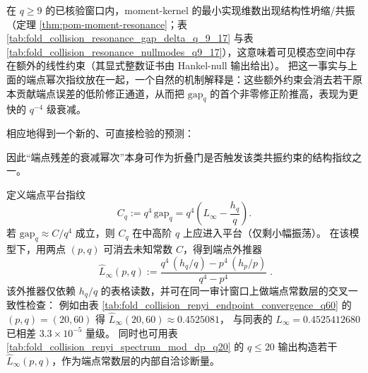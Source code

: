 \begin{remark}\label{rem:pom-endpoint-gap-resonance-link}
在 \(q\ge 9\) 的已核验窗口内，moment-kernel 的最小实现维数出现结构性坍缩/共振（定理 \ref{thm:pom-moment-resonance}；表 \ref{tab:fold_collision_resonance_gap_delta_q_9_17} 与表 \ref{tab:fold_collision_resonance_nullmodes_q9_17}），这意味着可见模态空间中存在额外的线性约束（其显式整数证书由 Hankel-null 输出给出）。
把这一事实与上面的端点幂次指纹放在一起，一个自然的机制解释是：这些额外约束会消去若干原本贡献端点误差的低阶修正通道，从而把 \(\mathrm{gap}_q\) 的首个非零修正阶推高，表现为更快的 \(q^{-4}\) 级衰减。
\par
相应地得到一个新的、可直接检验的预测：
\begin{center}
\end{center}
因此“端点残差的衰减幂次”本身可作为折叠门是否触发该类共振约束的结构指纹之一。
\end{remark}

\begin{remark}\label{rem:pom-endpoint-extrapolator}
定义端点平台指纹
\[
C_q:=q^4\,\mathrm{gap}_q
=q^4\left(L_\infty-\frac{h_q}{q}\right).
\]
若 \(\mathrm{gap}_q\approx C/q^4\) 成立，则 \(C_q\) 在中高阶 \(q\) 上应进入平台（仅剩小幅振荡）。
在该模型下，用两点 \((p,q)\) 可消去未知常数 \(C\)，得到端点外推器
\[
\boxed{\;
\widehat L_\infty(p,q)
:=\frac{q^4\,(h_q/q)-p^4\,(h_p/p)}{q^4-p^4}\; }.
\]
该外推器仅依赖 \(h_q/q\) 的表格读数，并可在同一审计窗口上做端点常数层的交叉一致性检查：
例如由表 \ref{tab:fold_collision_renyi_endpoint_convergence_q60} 的 \((p,q)=(20,60)\) 得
\(
\widehat L_\infty(20,60)\approx 0.4525081
\)，
与同表的 \(L_\infty=0.4525412680\) 已相差 \(3.3\times 10^{-5}\) 量级。
同时也可用表 \ref{tab:fold_collision_renyi_spectrum_mod_dp_q20} 的 \(q\le 20\) 输出构造若干 \(\widehat L_\infty(p,q)\)，作为端点常数层的内部自洽诊断量。
\end{remark}


